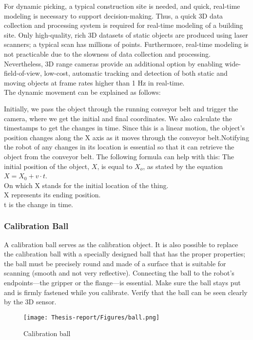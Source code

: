 \documentclass[12pt]{article}
\begin{document}
For dynamic picking, a typical construction site is needed, and quick, real-time modeling is necessary to support decision-making.  Thus, a quick 3D data collection and processing system is required for real-time modeling of a building site.  Only high-quality, rich 3D datasets of static objects are produced using laser scanners; a typical scan has millions of points.  Furthermore, real-time modeling is not practicable due to the slowness of data collection and processing.  Nevertheless, 3D range cameras provide an additional option by enabling wide-field-of-view, low-cost, automatic tracking and detection of both static and moving objects at frame rates higher than 1 Hz in real-time.\\

The dynamic movement can be explained as follows:

Initially, we pass the object through the running conveyor belt and trigger the camera, where we get the initial and final coordinates. We also calculate the timestamps to get the changes in time. Since this is a linear motion, the object's position changes along the X axis as it moves through the conveyor belt.Notifying the robot of any changes in its location is essential so that it can retrieve the object from the conveyor belt. The following formula can help with this:  The initial position of the object, $X$, is equal to $X_o$, as stated by the equation $X = X_0 + v\cdot t$.\\
On which X stands for the initial location of the thing.\\
X represents its ending position.\\
t is the change in time. 


\subsubsection{Calibration Ball}
A calibration ball serves as the calibration object. It is also possible to replace the calibration ball with a specially designed ball that has the proper properties; the ball must be precisely round and made of a surface that is suitable for scanning (smooth and not very reflective). Connecting the ball to the robot's endpoints—the gripper or the flange—is essential.  Make sure the ball stays put and is firmly fastened while you calibrate. Verify that the ball can be seen clearly by the 3D sensor\cite{ref2}. \\
\begin{figure}[h]
    \centering
    \texttt{[image: Thesis-report/Figures/ball.png]}
    \caption{Calibration ball \cite{ref2}}
    \label{fig:Photoneo Cmaera}
\end{figure} 
\end{document}
